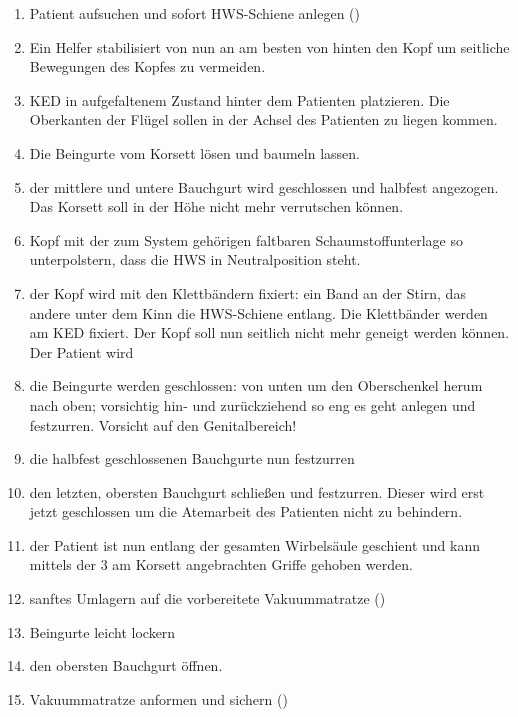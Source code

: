 \begin{enumerate}
    \item Patient aufsuchen und sofort HWS-Schiene anlegen
    ()
    \item Ein Helfer stabilisiert von nun an am besten von hinten den Kopf um seitliche Bewegungen des Kopfes
    zu vermeiden.
    \item KED  in aufgefaltenem Zustand
    hinter dem Patienten platzieren. Die Oberkanten der
    Flügel sollen in der Achsel des Patienten zu liegen
    kommen.
    \item Die Beingurte vom Korsett lösen und baumeln
    lassen.
    \item der mittlere und untere Bauchgurt wird
    geschlossen und halbfest angezogen. Das Korsett soll in der Höhe nicht mehr
    verrutschen können.
    \item Kopf mit der zum System gehörigen faltbaren
    Schaumstoffunterlage so unterpolstern, dass die HWS in
    Neutralposition steht.
    \item der Kopf wird mit den Klettbändern fixiert: ein
    Band an der Stirn, das andere unter dem Kinn die HWS-Schiene
    entlang. Die Klettbänder werden am KED
    fixiert. Der Kopf soll nun seitlich nicht mehr geneigt
    werden können. Der Patient wird 
    \item die Beingurte werden geschlossen: von unten um
    den Oberschenkel herum nach oben; vorsichtig hin- und
    zurückziehend so eng es geht anlegen und festzurren.
    Vorsicht auf den Genitalbereich!
    \item die halbfest geschlossenen Bauchgurte nun
    festzurren
    \item den letzten, obersten Bauchgurt schließen und
    festzurren. Dieser wird erst jetzt geschlossen um die
    Atemarbeit des Patienten nicht zu behindern.
    \item der Patient ist nun entlang der gesamten
    Wirbelsäule geschient und kann mittels der 3 am Korsett
    angebrachten Griffe gehoben werden.
    \item sanftes Umlagern auf die vorbereitete
    Vakuummatratze ()
    \item Beingurte leicht lockern
    \item den obersten Bauchgurt öffnen.
    \item Vakuummatratze anformen und sichern 
    ()
       
\end{enumerate}



